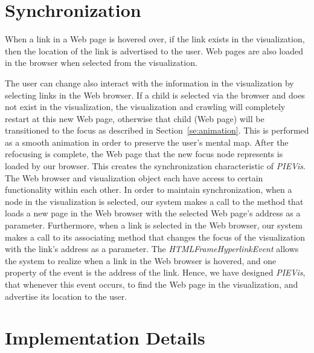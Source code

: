 \documentclass[]{article}
\begin{document}
{\section{Synchronization}
\label{se:synch}

When a link in a Web page is hovered over, if the link exists in the visualization, then the location of the link is advertised to the user.
Web pages are also loaded in the browser when selected from the visualization.

The user can change also interact with the information in the visualization by selecting links in the Web browser.
If a child is selected via the browser and does not exist in the visualization, the visualization and crawling will completely restart at this new Web page,
otherwise that child (Web page) will be transitioned to the focus as described in Section~\ref{se:animation}.
This is performed as a smooth animation in order to preserve the user's mental map.
After the refocusing is complete, the Web page that the new focus node represents is loaded by our browser.
This creates the synchronization characteristic of {\em PIEVis}.
The Web browser and visualization object each have access to certain functionality within each other.
In order to maintain synchronization, when a node in the visualization is selected, our system makes a call to the method that loads a new page in the Web browser with the selected Web page's address as a parameter.
Furthermore, when a link is selected in the Web browser, our system makes a call to its associating method that changes the focus of the visualization with the link's address as a parameter.
The {\em HTMLFrameHyperlinkEvent} allows the system to realize when a link in the Web browser is hovered, and one property of the event is the address of the link.  Hence, we have designed {\em PIEVis}, that whenever this event occurs, to find the Web page in the visualization, and advertise its location to the user.

\section{Implementation Details}
\label{se:implementation}

}
\end{document}
